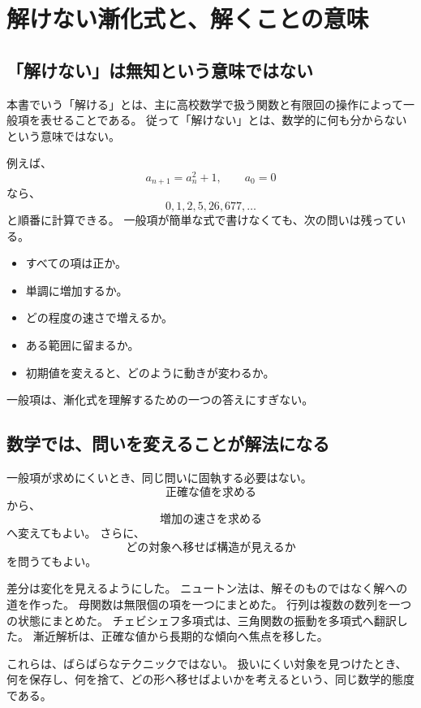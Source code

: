 
\section{解けない漸化式と、解くことの意味}

\subsection{「解けない」は無知という意味ではない}

本書でいう「解ける」とは、主に高校数学で扱う関数と有限回の操作によって一般項を表せることである。
従って「解けない」とは、数学的に何も分からないという意味ではない。

例えば、
\[
  a_{n+1}=a_n^2+1,\qquad a_0=0
\]
なら、
\[
  0,1,2,5,26,677,\ldots
\]
と順番に計算できる。
一般項が簡単な式で書けなくても、次の問いは残っている。

\begin{itemize}
  \item すべての項は正か。
  \item 単調に増加するか。
  \item どの程度の速さで増えるか。
  \item ある範囲に留まるか。
  \item 初期値を変えると、どのように動きが変わるか。
\end{itemize}

一般項は、漸化式を理解するための一つの答えにすぎない。

\subsection{数学では、問いを変えることが解法になる}

一般項が求めにくいとき、同じ問いに固執する必要はない。
\[
  \text{正確な値を求める}
\]
から、
\[
  \text{増加の速さを求める}
\]
へ変えてもよい。
さらに、
\[
  \text{どの対象へ移せば構造が見えるか}
\]
を問うてもよい。

差分は変化を見えるようにした。
ニュートン法は、解そのものではなく解への道を作った。
母関数は無限個の項を一つにまとめた。
行列は複数の数列を一つの状態にまとめた。
チェビシェフ多項式は、三角関数の振動を多項式へ翻訳した。
漸近解析は、正確な値から長期的な傾向へ焦点を移した。

これらは、ばらばらなテクニックではない。
扱いにくい対象を見つけたとき、何を保存し、何を捨て、どの形へ移せばよいかを考えるという、同じ数学的態度である。
